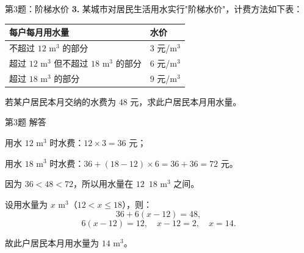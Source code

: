 \documentclass[10pt,aspectratio=169,serif,fleqn]{beamer}
\begin{document}
\begin{frame}[t]{第3题：阶梯水价}
\textbf{3.} 某城市对居民生活用水实行"阶梯水价"，计费方法如下表：

\vspace{0.3em}
\begin{center}
\begin{tabular}{l|l}
\toprule
每户每月用水量 & 水价 \\
\midrule
不超过 $12$ m$^3$ 的部分 & $3$ 元/m$^3$ \\
超过 $12$ m$^3$ 但不超过 $18$ m$^3$ 的部分 & $6$ 元/m$^3$ \\
超过 $18$ m$^3$ 的部分 & $9$ 元/m$^3$ \\
\bottomrule
\end{tabular}
\end{center}

\vspace{0.3em}
若某户居民本月交纳的水费为 $48$ 元，求此户居民本月用水量。
\end{frame}

\begin{frame}[t]{第3题 解答}
\begin{tcolorbox}[colback=orange!10,colframe=orange,title=\textbf{解}]
用水 $12$ m$^3$ 时水费：$12\times3=36$ 元；

用水 $18$ m$^3$ 时水费：$36+(18-12)\times6=36+36=72$ 元。

\vspace{0.3em}
因为 $36<48<72$，所以用水量在 $12$~$18$ m$^3$ 之间。

\vspace{0.3em}
设用水量为 $x$ m$^3$（$12<x\le18$），则：
\[
36+6(x-12)=48,
\]
\[
6(x-12)=12,\quad x-12=2,\quad x=14.
\]

\vspace{0.3em}
故此户居民本月用水量为 \alert{$14$ m$^3$}。
\end{tcolorbox}
\end{frame}
\end{document}
